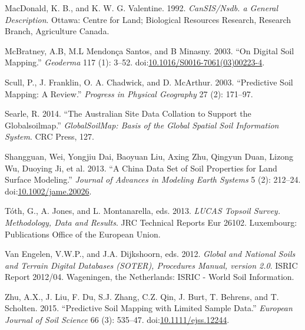 \documentclass[graybox,natbib,nospthms]{svmono}
\begin{document}
\hypertarget{ref-macdonald1992cansis}{}
MacDonald, K. B., and K. W. G. Valentine. 1992. \emph{CanSIS/Nsdb. a
General Description}. Ottawa: Centre for Land; Biological Resources
Research, Research Branch, Agriculture Canada.

\hypertarget{ref-MCBRATNEY20033}{}
McBratney, A.B, M.L Mendonça Santos, and B Minasny. 2003. ``On Digital
Soil Mapping.'' \emph{Geoderma} 117 (1): 3--52.
doi:\href{https://doi.org/10.1016/S0016-7061(03)00223-4}{10.1016/S0016-7061(03)00223-4}.

\hypertarget{ref-Scul01}{}
Scull, P., J. Franklin, O. A. Chadwick, and D. McArthur. 2003.
``Predictive Soil Mapping: A Review.'' \emph{Progress in Physical
Geography} 27 (2): 171--97.

\hypertarget{ref-searle2014australian}{}
Searle, R. 2014. ``The Australian Site Data Collation to Support the
Globalsoilmap.'' \emph{GlobalSoilMap: Basis of the Global Spatial Soil
Information System}. CRC Press, 127.

\hypertarget{ref-shangguan2013china}{}
Shangguan, Wei, Yongjiu Dai, Baoyuan Liu, Axing Zhu, Qingyun Duan,
Lizong Wu, Duoying Ji, et al. 2013. ``A China Data Set of Soil
Properties for Land Surface Modeling.'' \emph{Journal of Advances in
Modeling Earth Systems} 5 (2): 212--24.
doi:\href{https://doi.org/10.1002/jame.20026}{10.1002/jame.20026}.

\hypertarget{ref-Toth2013LUCAS}{}
Tóth, G., A. Jones, and L. Montanarella, eds. 2013. \emph{LUCAS Topsoil
Survey. Methodology, Data and Results}. JRC Technical Reports Eur 26102.
Luxembourg: Publications Office of the European Union.

\hypertarget{ref-VanEngelen2012}{}
Van Engelen, V.W.P., and J.A. Dijkshoorn, eds. 2012. \emph{Global and
National Soils and Terrain Digital Databases (SOTER), Procedures Manual,
version 2.0}. ISRIC Report 2012/04. Wageningen, the Netherlands: ISRIC -
World Soil Information.

\hypertarget{ref-Zhu2015PSM}{}
Zhu, A.X., J. Liu, F. Du, S.J. Zhang, C.Z. Qin, J. Burt, T. Behrens, and
T. Scholten. 2015. ``Predictive Soil Mapping with Limited Sample Data.''
\emph{European Journal of Soil Science} 66 (3): 535--47.
doi:\href{https://doi.org/10.1111/ejss.12244}{10.1111/ejss.12244}.
\end{document}
